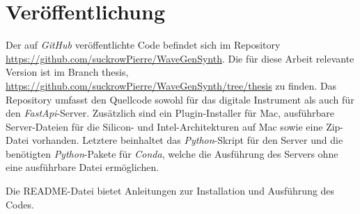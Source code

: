 \documentclass[
  a4paper,  %
  twoside,  %
  bibliography=totoc,
  headsepline,
  cleardoublepage=empty,
  parskip=half,
  draft=false
]{scrbook}
\begin{document}
\appendix
\chapter{Veröffentlichung}
\label{chap:git}
Der auf \emph{GitHub} \cite{noauthor_github_nodate} veröffentlichte Code befindet sich im Repository \url{https://github.com/suckrowPierre/WaveGenSynth}. Die für diese Arbeit relevante Version ist im Branch \glqq thesis\grqq , \url{https://github.com/suckrowPierre/WaveGenSynth/tree/thesis} zu finden. Das Repository umfasst den Quellcode sowohl für das digitale Instrument als auch für den \emph{FastApi}-Server. Zusätzlich sind ein Plugin-Installer für Mac, ausführbare Server-Dateien für die Silicon- und Intel-Architekturen auf Mac sowie eine Zip-Datei vorhanden. Letztere beinhaltet das \emph{Python}-Skript für den Server und die benötigten \emph{Python}-Pakete für \emph{Conda}, welche die Ausführung des Servers ohne eine ausführbare Datei ermöglichen.

Die README-Datei bietet Anleitungen zur Installation und Ausführung des Codes.






%
\pagestyle{empty}
\renewcommand*{\chapterpagestyle}{empty}
\Affirmation
\end{document}
